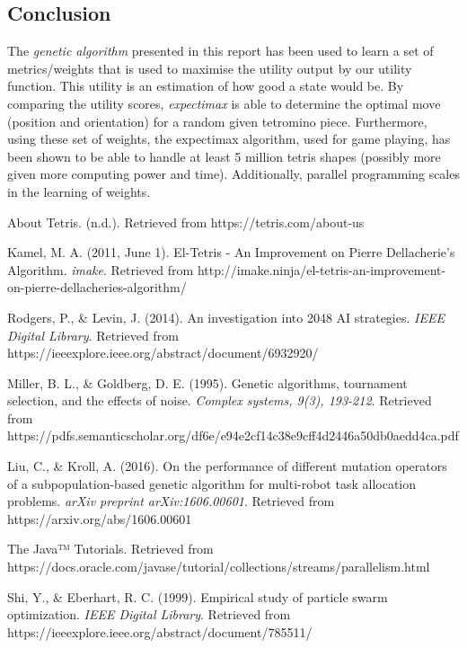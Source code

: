 \documentclass{article} %
\begin{document}
\begin{multicols}{2}
\section{Conclusion}
The \textsl{genetic algorithm} presented in this report has been used to learn a set of metrics/weights that is used to maximise the utility output by our utility function. This utility is an estimation of how good a state would be. By comparing the utility scores, \textsl{expectimax} is able to determine the optimal move (position and orientation) for a random given tetromino piece. Furthermore, using these set of weights, the expectimax algorithm, used for game playing, has been shown to be able to handle at least 5 million tetris shapes (possibly more given more computing power and time). Additionally, parallel programming scales in the learning of weights.



\end{multicols}

\begin{thebibliography}{9}
 About Tetris. (n.d.). Retrieved from https://tetris.com/about-us

Kamel, M. A. (2011, June 1). El-Tetris - An Improvement on Pierre Dellacherie’s Algorithm. \textit{imake}. Retrieved from http://imake.ninja/el-tetris-an-improvement-on-pierre-dellacheries-algorithm/

Rodgers, P., \& Levin, J. (2014). An investigation into 2048 AI strategies. \textit{IEEE Digital Library}. Retrieved from https://ieeexplore.ieee.org/abstract/document/6932920/

Miller, B. L., \& Goldberg, D. E. (1995). Genetic algorithms, tournament selection, and the effects of noise. 
\textit{Complex systems, 9(3), 193-212}. Retrieved from https://pdfs.semanticscholar.org/df6e/e94e2cf14c38e9cff4d2446a50db0aedd4ca.pdf

Liu, C., \& Kroll, A. (2016). On the performance of different mutation operators of a subpopulation-based genetic algorithm for multi-robot task allocation problems. 
\textit{arXiv preprint arXiv:1606.00601}. Retrieved from https://arxiv.org/abs/1606.00601

The Java™ Tutorials. Retrieved from https://docs.oracle.com/javase/tutorial/collections/streams/parallelism.html

Shi, Y., \& Eberhart, R. C. (1999). Empirical study of particle swarm optimization. \textit{IEEE Digital Library}.
Retrieved from https://ieeexplore.ieee.org/abstract/document/785511/
\end{thebibliography}
\end{document}
